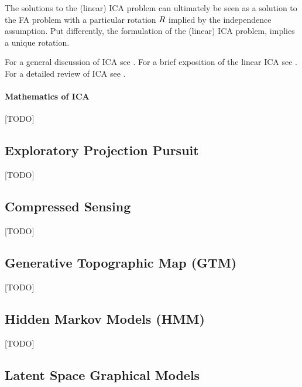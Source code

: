 \begin{remark}
The solutions to the (linear) ICA problem can ultimately be seen as a solution to the FA problem with a particular rotation $R$ implied by the independence assumption.
Put differently, the formulation of the (linear) ICA problem, implies a unique rotation. 
\end{remark}

For a general discussion of ICA see \cite{jolliffe_principal_2002}.
For a brief exposition of the linear ICA see \cite{hastie_elements_2003}. 
For a detailed review of ICA see \cite{hyvarinen_independent_2000}. 



\paragraph{Mathematics of ICA}
[TODO]








\subsection{Exploratory Projection Pursuit}
\label{sec:exploratpory_ppr}
[TODO]




\subsection{Compressed Sensing}
\label{sec:compressed_sensing}
[TODO]





\subsection{Generative Topographic Map (GTM)}
\label{sec:gtm}
[TODO]





\subsection{Hidden Markov Models (HMM)}
\label{sec:hmm}
[TODO]




\subsection{Latent Space Graphical Models}
\label{sec:latent_graphical}

